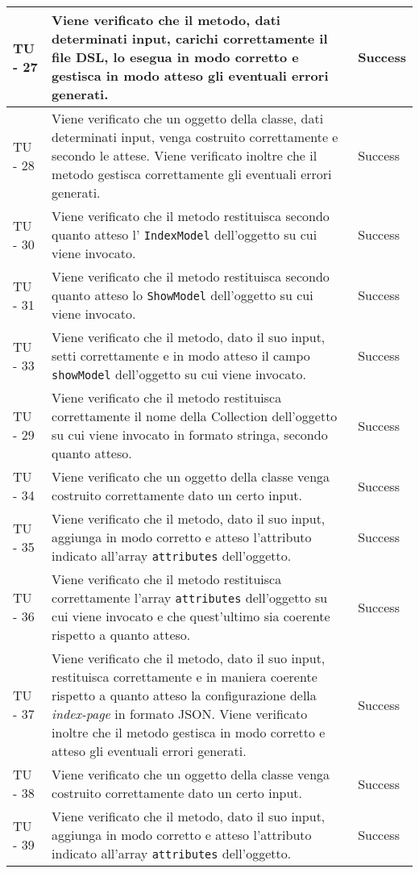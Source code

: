 \begin{center}
\begin{longtable}{ | p{3cm} | p{9cm} | p{2cm} | }
TU - 27 & Viene verificato che il metodo, dati determinati input, carichi correttamente il file DSL, lo esegua in modo corretto e gestisca in modo atteso gli eventuali errori generati. & Success \\ \hline
TU - 28 & Viene verificato che un oggetto della classe, dati determinati input, venga costruito correttamente e secondo le attese. Viene verificato inoltre che il metodo gestisca correttamente gli eventuali errori generati. & Success \\ \hline
TU - 30 & Viene verificato che il metodo restituisca secondo quanto atteso l' \texttt{IndexModel} dell'oggetto su cui viene invocato. & Success \\ \hline
TU - 31 & Viene verificato che il metodo restituisca secondo quanto atteso lo \texttt{ShowModel} dell'oggetto su cui viene invocato. & Success \\ \hline
TU - 33 & Viene verificato che il metodo, dato il suo input, setti correttamente e in modo atteso il campo \texttt{showModel} dell'oggetto su cui viene invocato. & Success \\ \hline
TU - 29 & Viene verificato che il metodo restituisca correttamente il nome della Collection dell'oggetto su cui viene invocato in formato stringa, secondo quanto atteso. & Success \\ \hline
TU - 34 & Viene verificato che un oggetto della classe venga costruito correttamente dato un certo input. & Success \\ \hline
TU - 35 & Viene verificato che il metodo, dato il suo input, aggiunga in modo corretto e atteso l'attributo indicato all'array \texttt{attributes} dell'oggetto. & Success \\ \hline
TU - 36 & Viene verificato che il metodo restituisca correttamente l'array \texttt{attributes} dell'oggetto su cui viene invocato e che quest'ultimo sia coerente rispetto a quanto atteso. & Success \\ \hline
TU - 37 & Viene verificato che il metodo, dato il suo input, restituisca correttamente e in maniera coerente rispetto a quanto atteso la configurazione della \textit{index-page} in formato JSON. Viene verificato inoltre che il metodo gestisca in modo corretto e atteso gli eventuali errori generati. & Success \\ \hline
TU - 38 & Viene verificato che un oggetto della classe venga costruito correttamente dato un certo input. & Success \\ \hline
TU - 39 & Viene verificato che il metodo, dato il suo input, aggiunga in modo corretto e atteso l'attributo indicato all'array \texttt{attributes} dell'oggetto. & Success \\ \hline

\end{longtable}
\end{center}
